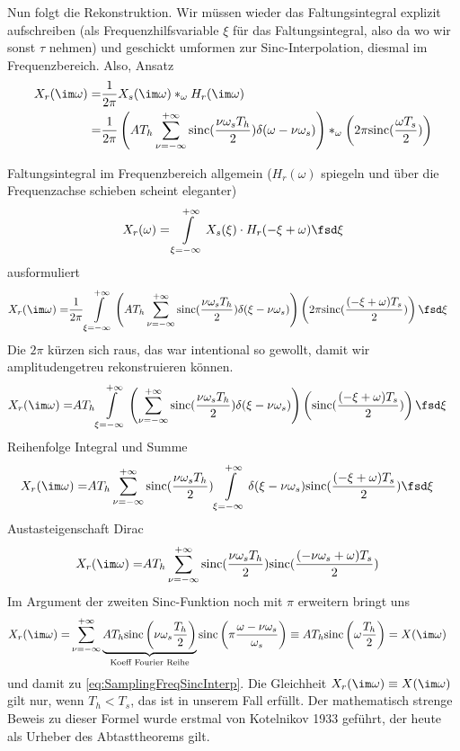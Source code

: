 \begin{Loesung}
Nun folgt die Rekonstruktion. Wir müssen wieder das Faltungsintegral explizit aufschreiben (als
Frequenzhilfsvariable $\xi$ für das Faltungsintegral, also da wo wir sonst $\tau$ nehmen)
und geschickt umformen zur Sinc-Interpolation, diesmal im Frequenzbereich.
%
Also, Ansatz
\begin{align}
X_r(\im\omega)
=& \frac{1}{2\pi} X_s(\im\omega) \ast_\omega H_r(\im\omega)\\
=& \frac{1}{2\pi} \left(A T_h \sum_{\nu=-\infty}^{+\infty} \mathrm{sinc}(\frac{\nu \omega_s T_h}{2}) \delta(\omega-\nu \omega_s)\right)
\ast_\omega \left(2\pi \mathrm{sinc}(\frac{\omega T_s}{2})\right)
\end{align}

Faltungsintegral im Frequenzbereich allgemein ($H_r(\omega)$ spiegeln und über
die Frequenzachse schieben scheint eleganter)
\begin{align}
X_r(\omega) = \int\limits_{\xi=-\infty}^{+\infty} X_s(\xi) \cdot H_r(-\xi + \omega) \fsd\xi
\end{align}
ausformuliert
\begin{align}
X_r(\im\omega)
=& \frac{1}{2\pi} \int\limits_{\xi=-\infty}^{+\infty}
\left(A T_h \sum_{\nu=-\infty}^{+\infty} \mathrm{sinc}(\frac{\nu \omega_s T_h}{2}) \delta(\xi-\nu \omega_s)\right)
\left(2\pi \mathrm{sinc}(\frac{(-\xi + \omega) T_s}{2})\right)
\fsd\xi
\end{align}
Die $2\pi$ kürzen sich raus, das war intentional so gewollt, damit wir amplitudengetreu rekonstruieren können.
\begin{align}
X_r(\im\omega)
=& A T_h \int\limits_{\xi=-\infty}^{+\infty}
\left(\sum_{\nu=-\infty}^{+\infty} \mathrm{sinc}(\frac{\nu \omega_s T_h}{2}) \delta(\xi-\nu \omega_s)\right)
\left(\mathrm{sinc}(\frac{(-\xi + \omega) T_s}{2})\right)
\fsd\xi
\end{align}
Reihenfolge Integral und Summe
\begin{align}
X_r(\im\omega)
=& A T_h \sum_{\nu=-\infty}^{+\infty} \mathrm{sinc}(\frac{\nu \omega_s T_h}{2})
\int\limits_{\xi=-\infty}^{+\infty}
 \delta(\xi-\nu \omega_s)
\mathrm{sinc}(\frac{(-\xi + \omega) T_s}{2})
\fsd\xi
\end{align}
Austasteigenschaft Dirac
\begin{align}
X_r(\im\omega)
=& A T_h \sum_{\nu=-\infty}^{+\infty} \mathrm{sinc}(\frac{\nu \omega_s T_h}{2})
\mathrm{sinc}(\frac{(-\nu \omega_s + \omega) T_s}{2})
\end{align}
Im Argument der zweiten Sinc-Funktion noch mit $\pi$ erweitern bringt uns
\begin{align}
X_r(\im\omega)
=& \sum_{\nu=-\infty}^{+\infty} \underbrace{A T_h \mathrm{sinc}\left(\nu \omega_s \frac{T_h}{2}\right)}_{\text{Koeff Fourier Reihe}}
\mathrm{sinc}\left(\pi \frac{\omega -\nu \omega_s}{\omega_s}\right)
\equiv A T_h \mathrm{sinc}\left(\omega \frac{T_h}{2}\right) = X(\im\omega)
\end{align}
und damit zu \eqref{eq:SamplingFreqSincInterp}. Die Gleichheit $X_r(\im\omega)
\equiv X(\im\omega)$ gilt nur, wenn $T_h < T_s$, das ist in unserem Fall erfüllt.
Der mathematisch strenge Beweis zu dieser Formel wurde erstmal von Kotelnikov 1933 geführt, der
heute als Urheber des Abtasttheorems gilt.


\end{Loesung}
